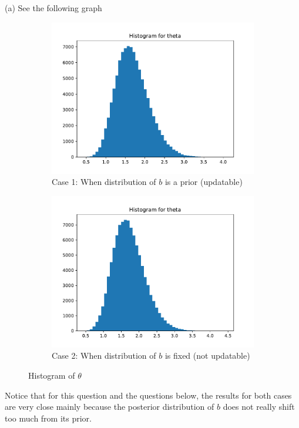 \documentclass{homeworg}
\begin{document}
(a) See the following graph
\begin{figure}[h]
	\centering
	\begin{subfigure}[b]{0.48\textwidth}
		\centering
		\includegraphics[width=\textwidth]{q3_parta_hist_theta_case1.pdf}
		\caption{Case 1: When distribution of $b$ is a prior (updatable)}
	\end{subfigure}
	\hfill
	\begin{subfigure}[b]{0.48\textwidth}
		\centering
		\includegraphics[width=\textwidth]{q3_parta_hist_theta_case2.pdf}
		\caption{Case 2: When distribution of $b$ is fixed (not updatable)}
	\end{subfigure}
	\caption{Histogram of $\theta$}
\end{figure}
Notice that for this question and the questions below, the results for both cases are very close mainly because the posterior distribution of $b$ does not really shift too much from its prior.
\end{document}
